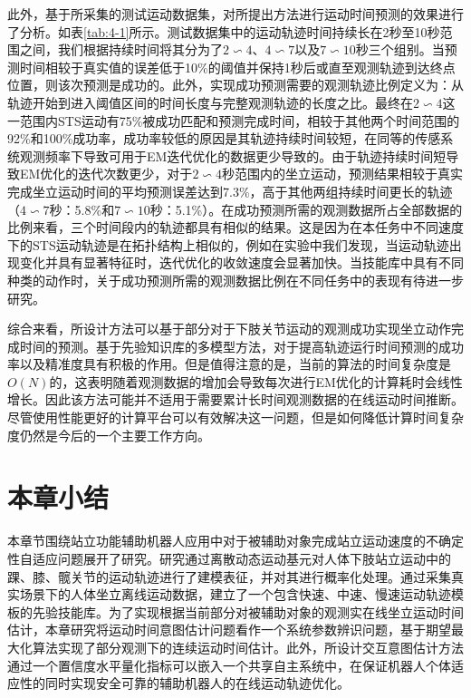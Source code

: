此外，基于所采集的测试运动数据集，对所提出方法进行运动时间预测的效果进行了分析。如表\ref{tab:4-1}所示。测试数据集中的运动轨迹时间持续长在2秒至10秒范围之间，我们根据持续时间将其分为了$2\backsim 4$、$4\backsim 7$以及$7\backsim 10$秒三个组别。当预测时间相较于真实值的误差低于10\%的阈值并保持1秒后或直至观测轨迹到达终点位置，则该次预测是成功的。此外，实现成功预测需要的观测轨迹比例定义为：从轨迹开始到进入阈值区间的时间长度与完整观测轨迹的长度之比。最终在$2\backsim 4$这一范围内STS运动有75\%被成功匹配和预测完成时间，相较于其他两个时间范围的92\%和100\%成功率，成功率较低的原因是其轨迹持续时间较短，在同等的传感系统观测频率下导致可用于EM迭代优化的数据更少导致的。由于轨迹持续时间短导致EM优化的迭代次数更少，对于$2\backsim 4$秒范围内的坐立运动，预测结果相较于真实完成坐立运动时间的平均预测误差达到7.3\%，高于其他两组持续时间更长的轨迹（$4\backsim 7$秒：5.8\%和$7\backsim 10$秒：5.1\%）。在成功预测所需的观测数据所占全部数据的比例来看，三个时间段内的轨迹都具有相似的结果。这是因为在本任务中不同速度下的STS运动轨迹是在拓扑结构上相似的，例如在实验中我们发现，当运动轨迹出现变化并具有显著特征时，迭代优化的收敛速度会显著加快。当技能库中具有不同种类的动作时，关于成功预测所需的观测数据比例在不同任务中的表现有待进一步研究。

综合来看，所设计方法可以基于部分对于下肢关节运动的观测成功实现坐立动作完成时间的预测。基于先验知识库的多模型方法，对于提高轨迹运行时间预测的成功率以及精准度具有积极的作用。但是值得注意的是，当前的算法的时间复杂度是$O(N)$的，这表明随着观测数据的增加会导致每次进行EM优化的计算耗时会线性增长。因此该方法可能并不适用于需要累计长时间观测数据的在线运动时间推断。尽管使用性能更好的计算平台可以有效解决这一问题，但是如何降低计算时间复杂度仍然是今后的一个主要工作方向。

\section{本章小结}
本章节围绕站立功能辅助机器人应用中对于被辅助对象完成站立运动速度的不确定性自适应问题展开了研究。研究通过离散动态运动基元对人体下肢站立运动中的踝、膝、髋关节的运动轨迹进行了建模表征，并对其进行概率化处理。通过采集真实场景下的人体坐立离线运动数据，建立了一个包含快速、中速、慢速运动轨迹模板的先验技能库。为了实现根据当前部分对被辅助对象的观测实在线坐立运动时间估计，本章研究将运动时间意图估计问题看作一个系统参数辨识问题，基于期望最大化算法实现了部分观测下的连续运动时间估计。此外，所设计交互意图估计方法通过一个置信度水平量化指标可以嵌入一个共享自主系统中，在保证机器人个体适应性的同时实现安全可靠的辅助机器人的在线运动轨迹优化。
